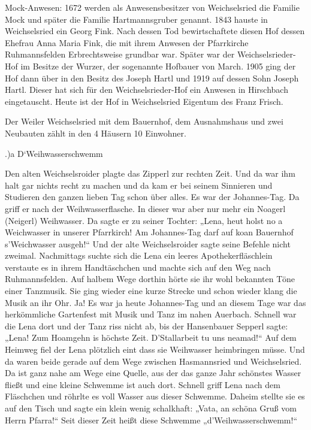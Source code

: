 \documentclass{book}
\begin{document}
Mock-Anwesen: 1672 werden als Anwesensbesitzer von Weichselsried die Familie
Mock und später die Familie Hartmannsgruber genannt. 1843 hauste in
Weichselsried ein Georg Fink. Nach dessen Tod bewirtschaftete diesen Hof dessen
Ehefrau Anna Maria Fink, die mit ihrem Anwesen der Pfarrkirche Ruhmannsfelden
Erbrechtsweise grundbar war. Später war der Weichselsrieder-Hof im Besitze der
Wurzer, der sogenannte Hofbauer von March. 1905 ging der Hof dann über in den
Besitz des Joseph Hartl und 1919 auf dessen Sohn Joseph Hartl. Dieser hat sich
für den Weichselsrieder-Hof ein Anwesen in Hirschbach eingetauscht. Heute ist
der Hof in Weichselsried Eigentum des Franz Frisch.

Der Weiler Weichselsried mit dem Bauernhof, dem Ausnahmshaus und zwei Neubauten
zählt in den 4 Häusern 10 Einwohner.

.)a D`Weihwasserschwemm

Den alten Weichselsroider plagte das Zipperl zur rechten Zeit. Und da war ihm
halt gar nichts recht zu machen und da kam er bei seinem Sinnieren und Studieren
den ganzen lieben Tag schon über alles. Es war der Johannes-Tag. Da griff er
nach der Weihwasserflasche. In dieser war aber nur mehr ein Noagerl (Neigerl)
Weihwasser. Da sagte er zu seiner Tochter: „Lena, heut holst no a Weichwasser in
unserer Pfarrkirch! Am Johannes-Tag darf auf koan Bauernhof s'Weichwasser
ausgeh!“ Und der alte Weichselsroider sagte seine Befehle nicht zweimal.
Nachmittags suchte sich die Lena ein leeres Apothekerfläschlein verstaute es in
ihrem Handtäschchen und machte sich auf den Weg nach Ruhmannsfelden. Auf halbem
Wege dorthin hörte sie ihr wohl bekannten Töne einer Tanzmusik. Sie ging wieder
eine kurze Strecke und schon wieder klang die Musik an ihr Ohr. Ja! Es war ja
heute Johannes-Tag und an diesem Tage war das herkömmliche Gartenfest mit Musik
und Tanz im nahen Auerbach. Schnell war die Lena dort und der Tanz riss nicht
ab, bis der Hansenbauer Sepperl sagte: „Lena! Zum Hoamgehn is höchste Zeit.
D'Stallarbeit tu uns neamad!“ Auf dem Heimweg fiel der Lena plötzlich eint dass
sie Weihwasser heimbringen müsse. Und da waren beide gerade auf dem Wege
zwischen Hasmannsried und Weichselsried. Da ist ganz nahe am Wege eine Quelle,
aus der das ganze Jahr schönstes Wasser fließt und eine kleine Schwemme ist auch
dort. Schnell griff Lena nach dem Fläschchen und röhrlte es voll Wasser aus
dieser Schwemme. Daheim stellte sie es auf den Tisch und sagte ein klein wenig
schalkhaft: „Vata, an schöna Gruß vom Herrn Pfarra!“ Seit dieser Zeit heißt
diese Schwemme „d'Weihwasserschwemm!“
\end{document}
